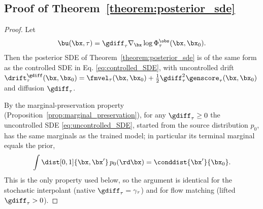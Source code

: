 \subsection{Proof of Theorem~\ref{theorem:posterior_sde}}
\begin{proof}
Let
\begin{align}
\bu(\bx,\tau) = \gdiff_\tau \nabla_{\bx} \log \Phi_\tau^{\obs}(\bx, \bx_0).
\end{align}
Then the posterior SDE of Theorem~\ref{theorem:posterior_sde} is of the same form as the controlled SDE in Eq. \eqref{eq:controlled_SDE}, with uncontrolled drift $\drift^{\gdiff}_\tau(\bx,\bx_0)=\fmvel_\tau(\bx,\bx_0)+\tfrac12\gdiff_\tau^2\genscore_\tau(\bx,\bx_0)$ and diffusion $\gdiff_\tau$.

By the marginal-preservation property (Proposition~\ref{prop:marginal_preservation}), for any $\gdiff_\tau\ge0$ the uncontrolled SDE \eqref{eq:uncontrolled_SDE}, started from the source distribution $p_0$, has the same marginals as the trained model; in particular its terminal marginal equals the prior,
\begin{align}\label{eq:terminal_marginal}
    \int \dist[0,1]{\bx, \bx'}\, p_0(\rd\bx) = \conddist{\bx'}{\bx_0}.
\end{align}
This is the only property used below, so the argument is identical for the stochastic interpolant (native $\gdiff_\tau=\gamma_\tau$) and for flow matching (lifted $\gdiff_\tau>0$).


\end{proof}
